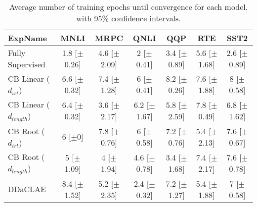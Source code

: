 \begin{table*}[ht]
\centering
\begingroup\small
\begin{tabular}{lcccccc}
  \hline
ExpName & MNLI & MRPC & QNLI & QQP & RTE & SST2 \\ 
  \hline
Fully Supervised & 1.8 [$\pm$0.26] & 4.6 [$\pm$2.09] & 2 [$\pm$0.41] & 3.4 [$\pm$0.89] & 5.6 [$\pm$1.68] & 2.6 [$\pm$0.89] \\ 
  CB Linear ($d_{irt}$) & 6.6 [$\pm$0.32] & 7.4 [$\pm$1.28] & 6 [$\pm$0.41] & 8.2 [$\pm$0.26] & 7.6 [$\pm$1.88] & 8 [$\pm$0.58] \\ 
  CB Linear ($d_{length}$) & 6.4 [$\pm$0.32] & 3.6 [$\pm$2.17] & 6.2 [$\pm$1.67] & 5.8 [$\pm$2.59] & 7.8 [$\pm$0.49] & 6.8 [$\pm$1.62] \\ 
  CB Root ($d_{irt}$) & 6 [$\pm$0] & 7.8 [$\pm$0.76] & 6 [$\pm$0.58] & 7.2 [$\pm$0.76] & 5.4 [$\pm$2.13] & 7.6 [$\pm$0.67] \\ 
  CB Root ($d_{length}$) & 5 [$\pm$1.09] & 4 [$\pm$1.94] & 4.6 [$\pm$0.78] & 3.4 [$\pm$1.68] & 7.4 [$\pm$2.17] & 7.6 [$\pm$0.78] \\ 
  DDaCLAE & 8.4 [$\pm$1.52] & 5.2 [$\pm$2.35] & 2.4 [$\pm$0.32] & 7.2 [$\pm$1.27] & 5.4 [$\pm$1.88] & 7 [$\pm$0.58] \\ 
   \hline
\end{tabular}
\endgroup
\caption{Average number of training epochs until convergence for each model, with 95\% confidence intervals.} 
\label{tab:epoch_bert-False}
\end{table*}
